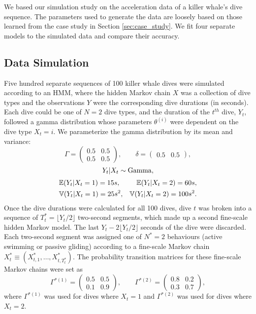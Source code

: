 

We based our simulation study on the acceleration data of a killer whale's dive sequence. The parameters used to generate the data are loosely based on those learned from the case study in Section \ref{sec:case_study}. We fit four separate models to the simulated data and compare their accuracy.

\subsection{Data Simulation}

Five hundred separate sequences of 100 killer whale dives were simulated according to an HMM, where the hidden Markov chain $X$ was a collection of dive types and the observations $Y$ were the corresponding dive durations (in seconds). Each dive could be one of $N=2$ dive types, and the duration of the $t^{th}$ dive, $Y_t$, followed a gamma distribution whose parameters $\theta^{(i)}$ were dependent on the dive type $X_t = i$. We parameterize the gamma distribution by its mean and variance:
%
$$\Gamma = \begin{pmatrix} 0.5 & 0.5 \\ 0.5 & 0.5 \end{pmatrix}, \qquad \delta =  \begin{pmatrix} 0.5 & 0.5 \end{pmatrix},$$
$$Y_t|X_t \sim \rm{Gamma},$$
\begin{align*}
	&\mathbb{E}(Y_t|X_t = 1) = 15 s, &\mathbb{E}(Y_t|X_t = 2) = 60 s, \\
	&\mathbb{V}(Y_t|X_t = 1) = 25 s^2, &\mathbb{V}(Y_t|X_t = 2) = 100 s^2.
\end{align*}
%
Once the dive durations were calculated for all 100 dives, dive $t$ was broken into a sequence of $T^*_t = \lfloor Y_t/2 \rfloor$ two-second segments, which made up a second fine-scale hidden Markov model. The last $Y_t - 2\lfloor Y_t/2 \rfloor$ seconds of the dive were discarded. Each two-second segment was assigned one of $N^*=2$ behaviours (active swimming or passive gliding) according to a fine-scale Markov chain $X^*_t \equiv \left(X^*_{t,1}, \ldots, X^*_{t,T^*_t} \right)$. The probability transition matrices for these fine-scale Markov chains were set as
%
$$\Gamma^{*(1)} = \begin{pmatrix} 0.5 & 0.5 \\ 0.1 & 0.9 \end{pmatrix}, \qquad \Gamma^{*(2)} = \begin{pmatrix} 0.8 & 0.2 \\ 0.3 & 0.7 \end{pmatrix},$$ 
%
where $\Gamma^{*(1)}$ was used for dives where $X_t = 1$ and $\Gamma^{*(2)}$ was used for dives where $X_t = 2$. 

